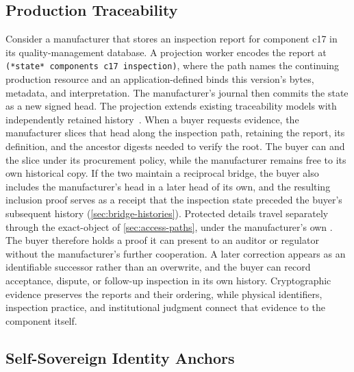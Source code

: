 \subsection{Production Traceability}

Consider a manufacturer that stores an inspection report for component c17 in its quality-management database. A projection worker encodes the report at \texttt{(*state* components c17 inspection)}, where the path names the continuing production resource and an application-defined  binds this version's bytes, metadata, and interpretation. The manufacturer's journal then commits the  state as a new signed head. The projection extends existing traceability models with independently retained history~\cite{Stouffer2022traceability,Hasan2009provenance}. When a buyer requests evidence, the manufacturer slices that head along the inspection path, retaining the report, its definition, and the ancestor digests needed to verify the root. The buyer can  and  the slice under its procurement policy, while the manufacturer remains free to  its own historical copy. If the two maintain a reciprocal bridge, the buyer also includes the manufacturer's head in a later head of its own, and the resulting inclusion proof serves as a receipt that the inspection state preceded the buyer's subsequent history (\cref{sec:bridge-histories}). Protected details travel separately through the exact-object  of \cref{sec:access-paths}, under the manufacturer's own . The buyer therefore holds a proof it can present to an auditor or regulator without the manufacturer's further cooperation. A later correction appears as an identifiable successor rather than an overwrite, and the buyer can record acceptance, dispute, or follow-up inspection in its own history. Cryptographic evidence preserves the reports and their ordering, while physical identifiers, inspection practice, and institutional judgment connect that evidence to the component itself.

\subsection{Self-Sovereign Identity Anchors}


